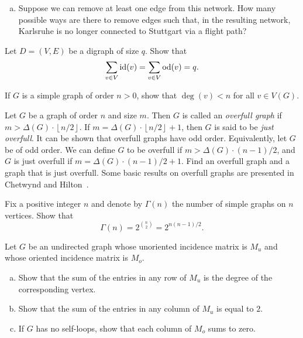 \begin{problem}
\begin{enumerate}[(a)]
  \item Suppose we can remove at least one edge from this network. How
    many possible ways are there to remove edges such that, in the
    resulting network, Karlsruhe is no longer connected to Stuttgart
    via a flight path?
  \end{enumerate}

\item Let $D = (V, E)$ be a digraph of size $q$. Show that
  \[
  \sum_{v \in V} \operatorname*{id}(v)
  =
  \sum_{v \in V} \operatorname*{od}(v)
  =
  q.
  \]

\item If $G$ is a simple graph of order $n > 0$, show that
  $\deg(v) < n$ for all $v \in V(G)$.

\item Let $G$ be a graph of order $n$ and size $m$. Then $G$ is called
  an \emph{overfull graph} if
  $m > \Delta(G) \cdot \left\lfloor n / 2 \right\rfloor$. If
  $m = \Delta(G) \cdot \left\lfloor n / 2 \right\rfloor + 1$, then $G$
  is said to be \emph{just overfull}. It can be shown that overfull
  graphs have odd order. Equivalently, let $G$ be of odd order. We can
  define $G$ to be overfull if $m > \Delta(G) \cdot (n-1)/2$,
  and $G$ is just overfull if $m = \Delta(G) \cdot (n-1)/2 + 1$. Find
  an overfull graph and a graph that is just overfull. Some basic
  results on overfull graphs are presented in Chetwynd and
  Hilton~\cite{ChetwyndHilton1986}.

\item Fix a positive integer $n$ and denote by $\Gamma(n)$ the number
  of simple graphs on $n$ vertices. Show that
  \[
  \Gamma(n)
  =
  2^{\binom{n}{2}}
  =
  2^{n(n-1) / 2}.
  \]

\item Let $G$ be an undirected graph whose unoriented incidence matrix
  is $M_u$ and whose oriented incidence matrix is $M_o$.
  \begin{enumerate}[(a)]
  \item Show that the sum of the entries in any row of $M_u$ is the
    degree of the corresponding vertex.

  \item Show that the sum of the entries in any column of $M_u$ is
    equal to $2$.

  \item If $G$ has no self-loops, show that each column of $M_o$ sums
    to zero.
  \end{enumerate}


\end{problem}
